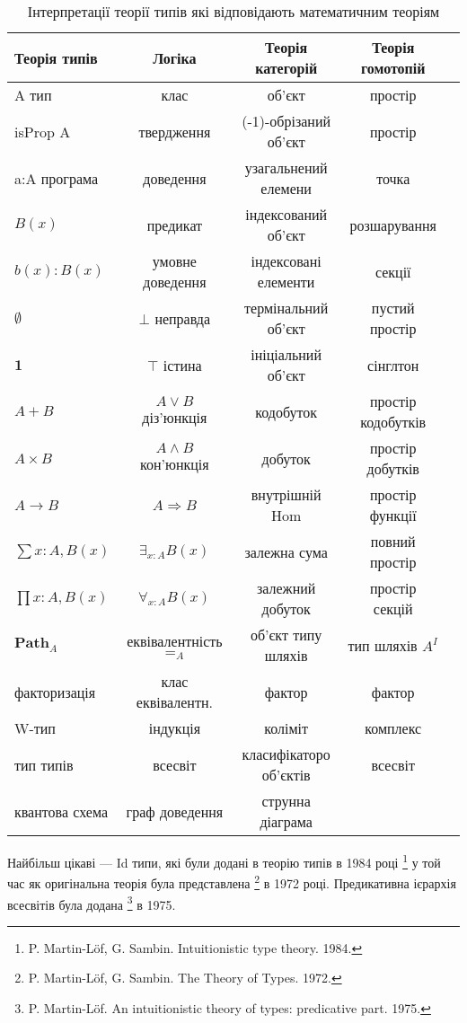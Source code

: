 \begin{table}[ht]
  \caption{Інтерпретації теорії типів які відповідають математичним теоріям}
 \begin{tabular}{lcccc}
    \hline
       \textbf{Теорія типів} & \textbf{Логіка} & \textbf{Теорія категорій} & \textbf{Теорія гомотопій} \\
    \hline
       A тип & клас & об'єкт & простір \\
       isProp A & твердження & (-1)-обрізаний об'єкт & простір \\
       a:A програма & доведення & узагальнений елемени & точка \\
       $B(x)$ & предикат & індексований об'єкт & розшарування \\
       $b(x) : B(x)$ & умовне доведення & індексовані елементи & секції\\
       $\emptyset$ & $\bot$ неправда & термінальний об'єкт & пустий простір \\
       $\mathbf{1}$ & $\top$ істина & ініціальний об'єкт & сінглтон \\
       $A + B$ & $A\vee B$ діз'юнкція & кодобуток & простір кодобутків \\
       $A\times B$ & $A\wedge B$ кон'юнкція & добуток & простір добутків \\
       $A\to B$ & $A\Rightarrow B$ & внутрішній Hom & простір функції \\
       $\sum{x:A},B(x)$ & $\exists_{x:A}B(x)$ & залежна сума & повний простір \\
       $\prod{x:A},B(x)$ & $\forall_{x:A}B(x)$ & залежний добуток & простір секцій\\
       $\mathbf{Path}_{A}$ & еквівалентність $=_A$ & об'єкт типу шляхів & тип шляхів $A^I$ \\
       факторизація & клас еквівалентн. & фактор & фактор \\
       W-тип & індукція & коліміт & комплекс\\
       тип типів & всесвіт & класифікаторо об'єктів & всесвіт \\
       квантова схема & граф доведення & струнна діаграма & \\
      \hline
  \end{tabular}
\end{table}

Найбільш цікаві --- Id типи, які були додані в теорію типів в 1984 році
\footnote{P. Martin-Löf, G. Sambin. Intuitionistic type theory. 1984.}
у той час як оригінальна теорія була представлена
\footnote{P. Martin-Löf, G. Sambin. The Theory of Types. 1972.} в 1972 році.
Предикативна ієрархія всесвітів була додана \footnote{P. Martin-Löf. An
intuitionistic theory of types: predicative part. 1975.} в 1975.

